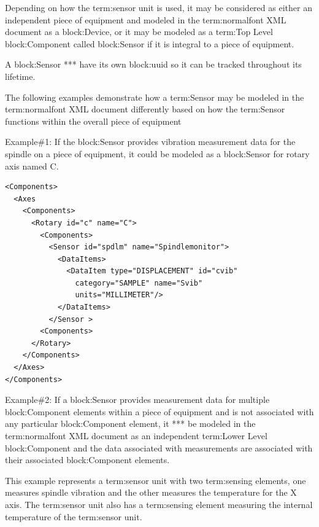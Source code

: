Depending on how the {term:sensor unit} is used, it may be considered as either an independent piece of equipment and modeled in the {term:normalfont XML} document as a {block:Device}, or it may be modeled as a {term:Top Level} {block:Component} called {block:Sensor} if it is integral to a piece of equipment.

A {block:Sensor} **\may** have its own {block:uuid} so it can be tracked throughout its lifetime.

The following examples demonstrate how a {term:Sensor} may be modeled in the {term:normalfont XML} document differently based on how the {term:Sensor} functions within the overall piece of equipment

Example\#1:   If the {block:Sensor} provides vibration measurement data for the spindle on a piece of equipment, it could be modeled as a {block:Sensor} for rotary axis named C.

\begin{lstlisting}[firstnumber=1,escapechar=|,%
    caption={Example of Sensor for rotary axis}, label={lst:example-of-sensor}]
<Components>
  <Axes
    <Components>
      <Rotary id="c" name="C">
        <Components>
          <Sensor id="spdlm" name="Spindlemonitor">
            <DataItems>
              <DataItem type="DISPLACEMENT" id="cvib"
                category="SAMPLE" name="Svib" 
                units="MILLIMETER"/>
            </DataItems>
          </Sensor >
        <Components>
      </Rotary>
    </Components>
  </Axes>
</Components>
\end{lstlisting}

Example\#2:   If a {block:Sensor} provides measurement data for multiple {block:Component} elements within a piece of equipment and is not associated with any particular {block:Component} element, it **\may** be modeled in the {term:normalfont XML} document as an independent {term:Lower Level} {block:Component} and the data associated with measurements are associated with their associated {block:Component} elements.

This example represents a {term:sensor unit} with two {term:sensing elements}, one measures spindle vibration and the other measures the temperature for the X axis.   The {term:sensor unit} also has a {term:sensing element} measuring the internal temperature of the {term:sensor unit}.

